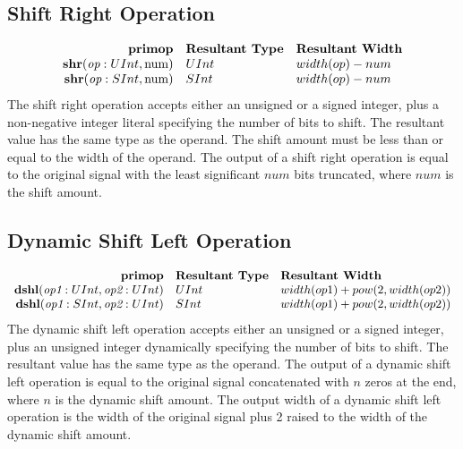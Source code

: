 \documentclass[12pt]{article}
\begin{document}
\subsection{Shift Right Operation}
\[
\begin{array}{rll}
\text{\bf primop} & \text{\bf Resultant Type} & \text{\bf Resultant Width} \\
\text{\bf shr}(\text{\em op}:UInt, \text{num})      & UInt & width(op) - num \\
\text{\bf shr}(\text{\em op}:SInt, \text{num})      & SInt & width(op) - num \\
\end{array}
\]
The shift right operation accepts either an unsigned or a signed integer, plus a non-negative integer literal specifying the number of bits to shift.
The resultant value has the same type as the operand.
The shift amount must be less than or equal to the width of the operand.
The output of a shift right operation is equal to the original signal with the least significant $num$ bits truncated, where $num$ is the shift amount.

\subsection{Dynamic Shift Left Operation}
\[
\begin{array}{rll}
\text{\bf primop} & \text{\bf Resultant Type} & \text{\bf Resultant Width} \\
\text{\bf dshl}(\text{\em op1}:UInt, \text{\em op2}:UInt)  & UInt & width(op1) + pow(2,width(op2)) \\
\text{\bf dshl}(\text{\em op1}:SInt, \text{\em op2}:UInt)  & SInt & width(op1) + pow(2,width(op2)) \\
\end{array}
\]
The dynamic shift left operation accepts either an unsigned or a signed integer, plus an unsigned integer dynamically specifying the number of bits to shift.
The resultant value has the same type as the operand.
The output of a dynamic shift left operation is equal to the original signal concatenated with $n$ zeros at the end, where $n$ is the dynamic shift amount.
The output width of a dynamic shift left operation is the width of the original signal plus 2 raised to the width of the dynamic shift amount.
\end{document}
